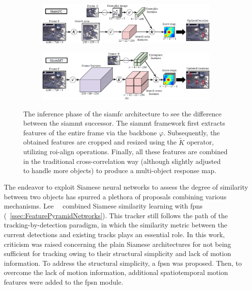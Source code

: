 \begin{figure}[!t]
    \centering
    \begin{subfigure}[b]{\textwidth}
        \centering
        \includegraphics[width=\textwidth]{figures/theoretical_foundations/siammt_orig.png}
        \caption[]{}
    \end{subfigure}
    \begin{subfigure}[b]{\textwidth}
        \centering
        \includegraphics[width=\textwidth]{figures/theoretical_foundations/siammt_new.png}
        \caption[]{}
    \end{subfigure}
    \caption[\Gls{siammt} architecture]{The inference phase of the  \gls{siamfc} architecture to see the difference between the  \gls{siammt} successor. The \gls{siammt} framework first extracts features of the entire frame via the backbone $\varphi$. Subsequently, the obtained features are cropped and resized using the $\tilde{K}$ operator, utilizing \gls{roi}-align operations. Finally, all these features are combined in the traditional cross-correlation way (although slightly adjusted to handle more objects) to produce a multi-object response map. }
    \label{fig:SiamMTArchitecture}
\end{figure}

The endeavor to exploit Siamese neural networks to assess the degree of similarity between two objects has spurred a plethora of proposals combining various mechanisms. Lee~\etal{}~\cite{lee2019motfpsn} combined Siamese similarity learning with \Glspl{fpn} (\sectiontext{}~\ref{ssec:FeaturePyramidNetworks}). This tracker still follows the path of the tracking-by-detection paradigm, in which the similarity metric between the current detections and existing tracks plays an essential role. In this work, criticism was raised concerning the plain Siamese architectures for not being sufficient for tracking owing to their structural simplicity and lack of motion information. To address the structural simplicity, a \gls{fpsn} was proposed. Then, to overcome the lack of motion information, additional spatiotemporal motion features were added to the \gls{fpsn} module.

